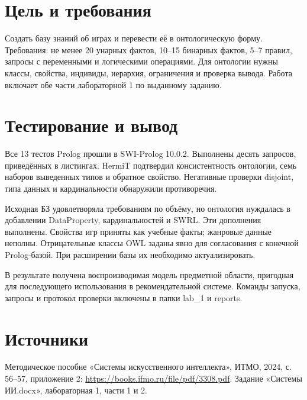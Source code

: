 

\section{Цель и требования}
Создать базу знаний об играх и перевести её в онтологическую форму.
Требования: не менее 20 унарных фактов, 10--15 бинарных фактов, 5--7 правил,
запросы с переменными и логическими операциями. Для онтологии нужны
классы, свойства, индивиды, иерархия, ограничения и проверка вывода.
Работа включает обе части лабораторной 1 по выданному заданию.

\clearpage
\section{Тестирование и вывод}
Все 13 тестов Prolog прошли в SWI-Prolog 10.0.2. Выполнены десять запросов,
приведённых в листингах. HermiT подтвердил консистентность онтологии,
семь наборов выведенных типов и обратное свойство. Негативные проверки
disjoint, типа данных и кардинальности обнаружили противоречия.

Исходная БЗ удовлетворяла требованиям по объёму, но онтология нуждалась
в добавлении DataProperty, кардинальностей и SWRL. Эти дополнения выполнены.
Свойства игр приняты как учебные факты; жанровые данные неполны.
Отрицательные классы OWL заданы явно для согласования с конечной Prolog-базой.
При расширении базы их необходимо актуализировать.

В результате получена воспроизводимая модель предметной области, пригодная
для последующего использования в рекомендательной системе. Команды запуска,
запросы и протокол проверки включены в папки lab\_1 и reports.

\section{Источники}
Методическое пособие «Системы искусственного интеллекта», ИТМО, 2024,
с. 56--57, приложение 2: \url{https://books.ifmo.ru/file/pdf/3308.pdf}.
Задание «Системы ИИ.docx», лабораторная 1, части 1 и 2.

